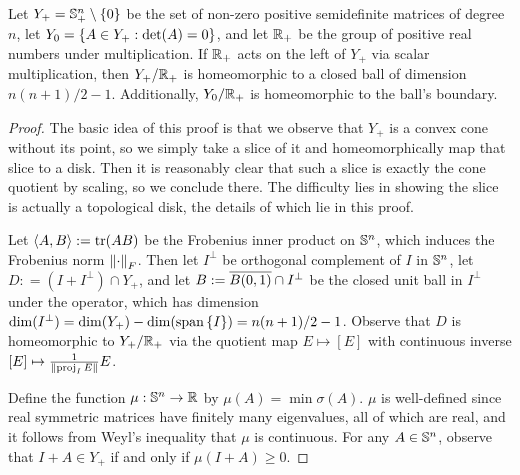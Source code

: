 \begin{proposition}\label{prop:PSD-mod-scale-cong-ball}
    Let $Y_+ = \S^n_+ \setminus \set{0}$ be the set of non-zero positive semidefinite matrices of degree $n$, let $Y_0 = \set{A \in Y_+ : \det(A) = 0}$, and let $\Rp$ be the group of positive real numbers under multiplication.
    If $\Rp$ acts on the left of $Y_+$ via scalar multiplication, then $Y_+/\Rp$ is homeomorphic to a closed ball of dimension $n(n+1)/2 - 1$.
    Additionally, $Y_0/\Rp$ is homeomorphic to the ball's boundary.
    
    \begin{proof}
        The basic idea of this proof is that we observe that $Y_+$ is a convex cone without its point, so we simply take a slice of it and homeomorphically map that slice to a disk.
        Then it is reasonably clear that such a slice is exactly the cone quotient by scaling, so we conclude there.
        The difficulty lies in showing the slice is actually a topological disk, the details of which lie in this proof.

        Let $\angles{A,B} := \tr(AB)$ be the Frobenius inner product on $\S^n$, which induces the Frobenius norm $\norm{\cdot}_F$.
        Then let $I^\perp$ be orthogonal complement of $I$ in $\S^n$, let $D: = (I + I^\perp) \cap Y_+$, and let $B := \clo{B(0,1)} \cap I^\perp$ be the closed unit ball in $I^\perp$ under the operator, which has dimension $\dim(I^\perp) = \dim(Y_+) - \dim(\Span\set{I}) = n(n+1)/2 - 1$.
        Observe that $D$ is homeomorphic to $Y_+ / \Rp$ via the quotient map $E \mapsto [E]$ with continuous inverse $[E] \mapsto \f{1}{\norm{\proj_I E}} E$.

        Define the function $\mu : \S^n \to \R$ by $\mu(A) = \min \sigma(A)$.
        $\mu$ is well-defined since real symmetric matrices have finitely many eigenvalues, all of which are real, and it follows from Weyl's inequality that $\mu$ is continuous.
        For any $A \in \S^n$, observe that $I + A \in Y_+$ if and only if $\mu(I + A) \geq 0$.


\end{proof}
\end{proposition}
